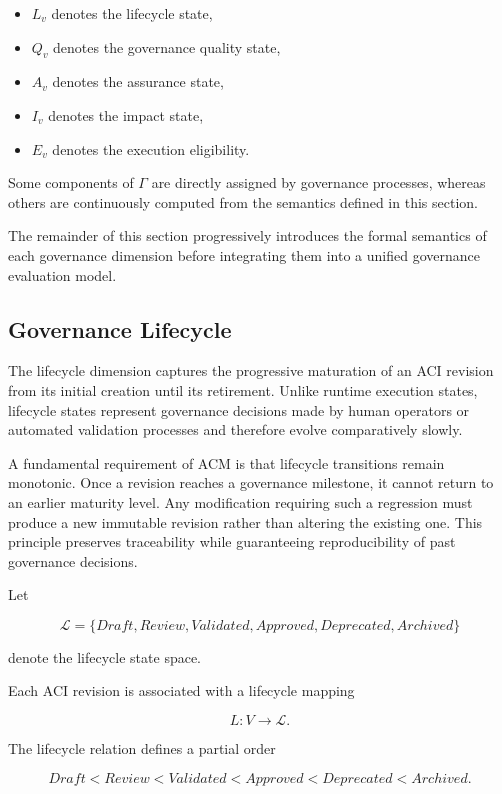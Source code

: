 \documentclass[10pt]{article}
\begin{document}
\begin{itemize}
    \item $L_v$ denotes the lifecycle state,
    \item $Q_v$ denotes the governance quality state,
    \item $A_v$ denotes the assurance state,
    \item $I_v$ denotes the impact state,
    \item $E_v$ denotes the execution eligibility.
\end{itemize}

Some components of $\Gamma$ are directly assigned by governance processes,
whereas others are continuously computed from the semantics defined in this
section.

The remainder of this section progressively introduces the formal semantics of
each governance dimension before integrating them into a unified governance
evaluation model.

\subsection{Governance Lifecycle}
\label{subsec:lifecycle}

The lifecycle dimension captures the progressive maturation of an ACI revision
from its initial creation until its retirement. Unlike runtime execution
states, lifecycle states represent governance decisions made by human operators
or automated validation processes and therefore evolve comparatively slowly.

A fundamental requirement of ACM is that lifecycle transitions remain
monotonic. Once a revision reaches a governance milestone, it cannot return to
an earlier maturity level. Any modification requiring such a regression must
produce a new immutable revision rather than altering the existing one. This
principle preserves traceability while guaranteeing reproducibility of past
governance decisions.

Let

\[
\mathcal{L}
=
\{
Draft,
Review,
Validated,
Approved,
Deprecated,
Archived
\}
\]

denote the lifecycle state space.

Each ACI revision is associated with a lifecycle mapping

\[
L:V\rightarrow\mathcal{L}.
\]

The lifecycle relation defines a partial order

\[
Draft
<
Review
<
Validated
<
Approved
<
Deprecated
<
Archived.
\]
\end{document}
